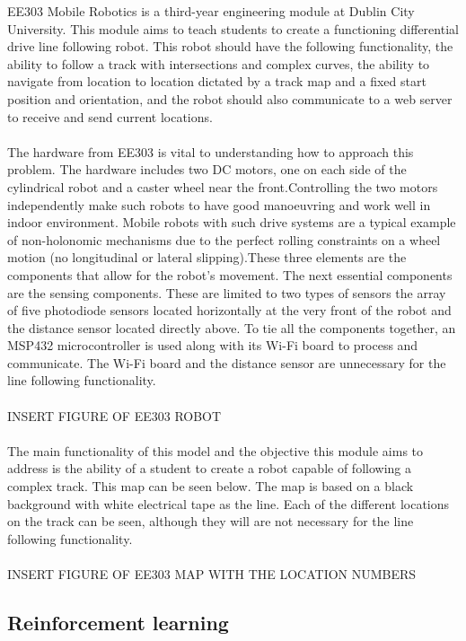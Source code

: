 \documentclass[a4paper,11pt]{article}
\begin{document}
EE303 Mobile Robotics is a third-year engineering module at Dublin City University. This module aims to teach students to create a functioning differential drive line following robot. This robot should have the following functionality, the ability to follow a track with intersections and complex curves, the ability to navigate from location to location dictated by a track map and a fixed start position and orientation, and the robot should also communicate to a web server to receive and send current locations.
\\\\
The hardware from EE303 is vital to understanding how to approach this problem. The hardware includes two DC motors, one on each side of the cylindrical robot and a caster wheel near the front.Controlling the two motors independently make such robots to have good manoeuvring and work well in indoor environment. Mobile robots with such drive systems are a typical example of non-holonomic mechanisms due to the perfect rolling constraints on a wheel motion (no longitudinal or lateral slipping)\cite{}.These three elements are the components that allow for the robot's movement. The next essential components are the sensing components. These are limited to two types of sensors the array of five photodiode sensors located horizontally at the very front of the robot and the distance sensor located directly above. To tie all the components together, an MSP432 microcontroller is used along with its Wi-Fi board to process and communicate. The Wi-Fi board and the distance sensor are unnecessary for the line following functionality.
\\\\
INSERT FIGURE OF EE303 ROBOT
\\\\
The main functionality of this model and the objective this module aims to address is the ability of a student to create a robot capable of following a complex track. This map can be seen below. The map is based on a black background with white electrical tape as the line. Each of the different locations on the track can be seen, although they will are not necessary for the line following functionality.
\\\\
INSERT FIGURE OF EE303 MAP WITH THE LOCATION NUMBERS

\subsection{Reinforcement learning}
\end{document}
